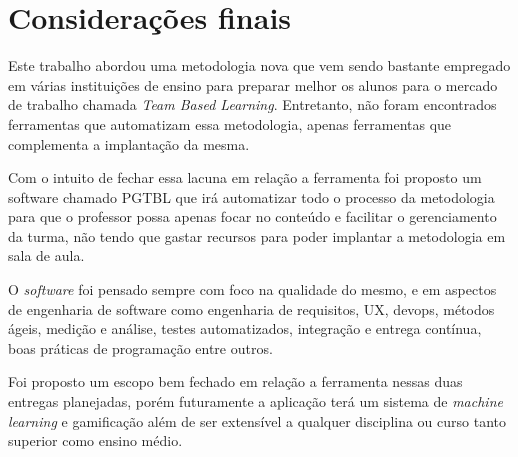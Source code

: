 \chapter{Considerações finais}

Este trabalho abordou uma metodologia nova que vem sendo bastante empregado em várias instituições de ensino para preparar melhor os alunos para o mercado de trabalho chamada \textit{Team Based Learning}. Entretanto, não foram encontrados ferramentas que automatizam essa metodologia, apenas ferramentas que complementa a implantação da mesma.

Com o intuito de fechar essa lacuna em relação a ferramenta foi proposto um software chamado PGTBL que irá automatizar todo o processo da metodologia para que o professor possa apenas focar no conteúdo e facilitar o gerenciamento da turma, não tendo que gastar recursos para poder implantar a metodologia em sala de aula.

O \textit{software} foi pensado sempre com foco na qualidade do mesmo, e em aspectos de engenharia de software como engenharia de requisitos, UX, devops, métodos ágeis, medição e análise, testes automatizados, integração e entrega contínua, boas práticas de programação entre outros.

Foi proposto um escopo bem fechado em relação a ferramenta nessas duas entregas planejadas, porém futuramente a aplicação terá um sistema de \textit{machine learning} e gamificação além de ser extensível a qualquer disciplina ou curso tanto superior como ensino médio.
